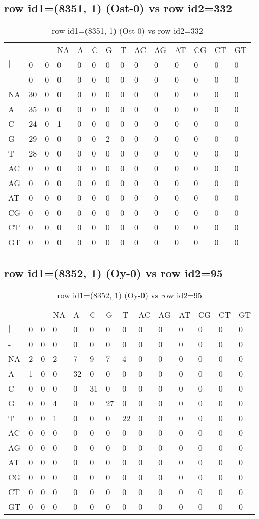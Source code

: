 \subsection{row id1=(8351, 1) (Ost-0) vs row id2=332}
\begin{center}
\begin{longtable}{|l|l|l|l|l|l|l|l|l|l|l|l|l|l|}
\caption{row id1=(8351, 1) (Ost-0) vs row id2=332} \label{table_dm568}\\
\hline
\\
\hline
&$|$&-&NA&A&C&G&T&AC&AG&AT&CG&CT&GT\\
$|$&0&0&0&0&0&0&0&0&0&0&0&0&0\\
-&0&0&0&0&0&0&0&0&0&0&0&0&0\\
NA&30&0&0&0&0&0&0&0&0&0&0&0&0\\
A&35&0&0&0&0&0&0&0&0&0&0&0&0\\
C&24&0&1&0&0&0&0&0&0&0&0&0&0\\
G&29&0&0&0&0&2&0&0&0&0&0&0&0\\
T&28&0&0&0&0&0&0&0&0&0&0&0&0\\
AC&0&0&0&0&0&0&0&0&0&0&0&0&0\\
AG&0&0&0&0&0&0&0&0&0&0&0&0&0\\
AT&0&0&0&0&0&0&0&0&0&0&0&0&0\\
CG&0&0&0&0&0&0&0&0&0&0&0&0&0\\
CT&0&0&0&0&0&0&0&0&0&0&0&0&0\\
GT&0&0&0&0&0&0&0&0&0&0&0&0&0\\
\hline
\end{longtable}
\end{center}

\subsection{row id1=(8352, 1) (Oy-0) vs row id2=95}
\begin{center}
\begin{longtable}{|l|l|l|l|l|l|l|l|l|l|l|l|l|l|}
\caption{row id1=(8352, 1) (Oy-0) vs row id2=95} \label{table_dm570}\\
\hline
\\
\hline
&$|$&-&NA&A&C&G&T&AC&AG&AT&CG&CT&GT\\
$|$&0&0&0&0&0&0&0&0&0&0&0&0&0\\
-&0&0&0&0&0&0&0&0&0&0&0&0&0\\
NA&2&0&2&7&9&7&4&0&0&0&0&0&0\\
A&1&0&0&32&0&0&0&0&0&0&0&0&0\\
C&0&0&0&0&31&0&0&0&0&0&0&0&0\\
G&0&0&4&0&0&27&0&0&0&0&0&0&0\\
T&0&0&1&0&0&0&22&0&0&0&0&0&0\\
AC&0&0&0&0&0&0&0&0&0&0&0&0&0\\
AG&0&0&0&0&0&0&0&0&0&0&0&0&0\\
AT&0&0&0&0&0&0&0&0&0&0&0&0&0\\
CG&0&0&0&0&0&0&0&0&0&0&0&0&0\\
CT&0&0&0&0&0&0&0&0&0&0&0&0&0\\
GT&0&0&0&0&0&0&0&0&0&0&0&0&0\\
\hline
\end{longtable}
\end{center}

